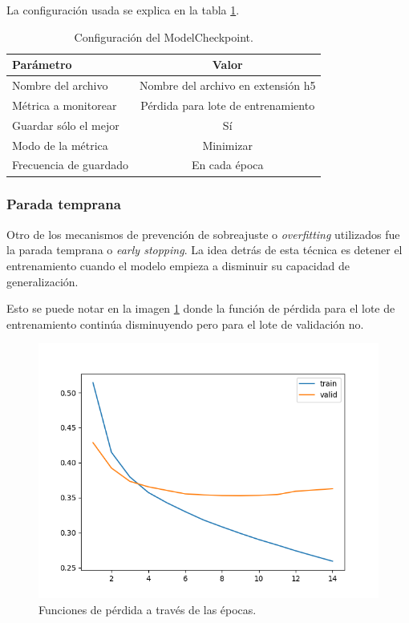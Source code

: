La configuración usada se explica en la tabla \ref{tab:checkpoint}.
\begin{table}[H]
	\centering
	\caption[Configuración ModelCheckpoint]{Configuración del ModelCheckpoint.}
	\begin{tabular}{l c}    
		\toprule
		\textbf{Parámetro}			& 			\textbf{Valor}  \\
		\midrule	
		Nombre del archivo			& 			Nombre del archivo en extensión h5  \\
		Métrica a monitorear 		& 			Pérdida para lote de entrenamiento  \\
		Guardar sólo el mejor		&			Sí \\
		Modo de la métrica 			& 			Minimizar \\
		Frecuencia de guardado 		& 			En cada época  \\
		\bottomrule
		\hline
	\end{tabular}
	\label{tab:checkpoint}
\end{table}

\subsubsection{Parada temprana}

Otro de los mecanismos de prevención de sobreajuste o \textit{overfitting} utilizados fue la parada temprana o \textit{early stopping}. La idea detrás de esta técnica es detener el entrenamiento cuando el modelo empieza a disminuir su capacidad de generalización.

Esto se puede notar en la imagen \ref{fig:cap3-overfitting} donde la función de pérdida para el lote de entrenamiento continúa disminuyendo pero para el lote de validación no.

\begin{figure}[htbp]
	\centering
	\includegraphics[width=.8\textwidth]{./Figures/cap3-overfitting.png}
	\caption{Funciones de pérdida a través de las épocas.}
	\label{fig:cap3-overfitting}
\end{figure}

